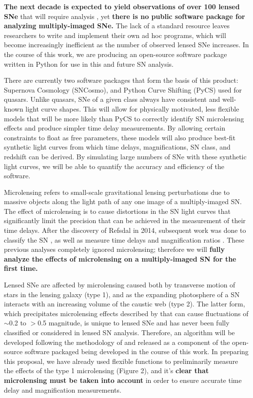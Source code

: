 
\textbf{The next decade is expected to yield observations
of over 100 lensed SNe} that will require analysis \citep{Oguri:2010},
yet \textbf{there is no public software package for analyzing multiply-imaged SNe.}
The lack of a standard resource leaves researchers to write and implement their 
own ad hoc programs, which will become increasingly inefficient as the number of
observed lensed SNe increases. In the course of this work, 
we are producing an open-source software package written in Python for use in this and future SN analysis.

There are currently two software packages that form the basis 
of this product: Supernova Cosmology (SNCosmo), and Python Curve Shifting (PyCS) used for quasars. Unlike quasars, 
SNe of a given class always have consistent and well-known light curve shapes. This will allow for physically motivated, 
less flexible models that will be more likely than PyCS to correctly identify SN 
microlensing effects and produce simpler time delay measurements. By allowing certain constraints to float as free 
parameters, these models will also produce best-fit synthetic light curves from which time delays, magnifications, 
SN class, and redshift can be derived. By simulating large numbers of SNe with these synthetic light curves, we will 
be able to quantify the accuracy and efficiency of the software.

\bigskip


Microlensing refers to small-scale gravitational lensing
perturbations due to massive objects along the light path of any one image of a
multiply-imaged SN. The effect of microlensing is to cause distortions in the SN light
curves that significantly limit the precision that can be achieved in the measurement of 
their time delays. After the discovery of Refsdal in 2014, subsequent work was done to 
classify the SN \citep{Kelly:2016}, as well as measure time delays and magnification
ratios \citep{Rodney:2016}. These previous analyses completely ignored microlensing; 
therefore we will \textbf{fully analyze the effects of microlensing on a multiply-imaged SN for the first time.}

Lensed SNe are affected by microlensing caused both by transverse motion of stars in the lensing galaxy (type 1), and as the
expanding photosphere of a SN interacts with an increasing volume of the caustic web (type 2). The latter form, which precipitates
microlensing effects described by \cite{Dobler:2006} that can cause fluctuations of $\sim$0.2 to $>$0.5 magnitude, is unique 
to lensed SNe and has never been fully classified or considered in lensed SN analysis. Therefore, an algorithm will be developed 
following the methodology of \cite{Dobler:2006} and released as a component of the open-source software packaged being 
developed in the course of this work. In preparing this proposal, we have already used flexible functions to preliminarily 
measure the effects of the type 1 microlensing (Figure 2), and it's \textbf{clear that microlensing must be taken into account} in order
to ensure accurate time delay and magnification measurements. 


